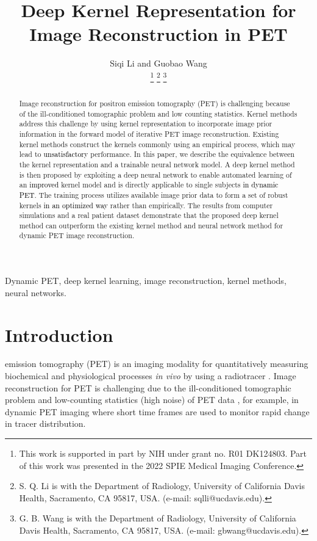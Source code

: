 \documentclass[]{IEEETran}
\newcommand{\txtb}[1]{\textcolor{black}{#1}}
\begin{document}
	\title{{Deep Kernel Representation for Image Reconstruction in PET}}
	\author{Siqi Li and Guobao Wang
		
		\thanks{This work is supported in part by NIH under grant no. R01 DK124803. Part of this work was presented in the 2022 SPIE Medical Imaging Conference.
		}
		\thanks{S. Q. Li is with the Department of Radiology, University of California Davis Health, Sacramento, CA 95817, USA. (e-mail: sqlli@ucdavis.edu).}
		\thanks{G. B. Wang is with the Department of Radiology, University of California Davis Health, Sacramento, CA 95817, USA. (e-mail: gbwang@ucdavis.edu).}}
	
	\maketitle

	\begin{abstract}
		Image reconstruction for positron emission tomography (PET) is challenging because of the ill-conditioned tomographic problem and low counting statistics. Kernel methods address this challenge by using kernel representation to incorporate image prior information in the forward model of iterative PET image reconstruction. Existing kernel methods construct the kernels commonly using an empirical process, which may lead to \txtb{unsatisfactory} performance. In this paper, we describe the equivalence between the kernel representation and a trainable neural network model. A deep kernel method is then proposed by exploiting a deep neural network to enable automated learning of an \txtb{improved} kernel model and is directly applicable to single subjects \txtb{in dynamic PET}. The training process utilizes available image prior data to form a set of robust  kernels \txtb{in an optimized way} rather than empirically. The results from computer simulations and a real patient dataset demonstrate that the proposed deep kernel method can outperform the existing kernel method and neural network method for dynamic PET image reconstruction.
	\end{abstract}
	\begin{IEEEkeywords}
		Dynamic PET, deep kernel learning, image reconstruction, kernel methods, neural networks.
	\end{IEEEkeywords}
	\section{Introduction}
	 emission tomography (PET) is an imaging modality for quantitatively measuring biochemical and physiological processes \emph{in vivo} by using a radiotracer \cite{Vaquero2015}. Image reconstruction for PET is challenging due to the ill-conditioned tomographic problem and low-counting statistics (high noise) of PET data \cite{Qi2006}, for example, in dynamic PET imaging where short time frames are used to monitor rapid change in tracer distribution.
	
\end{document}
